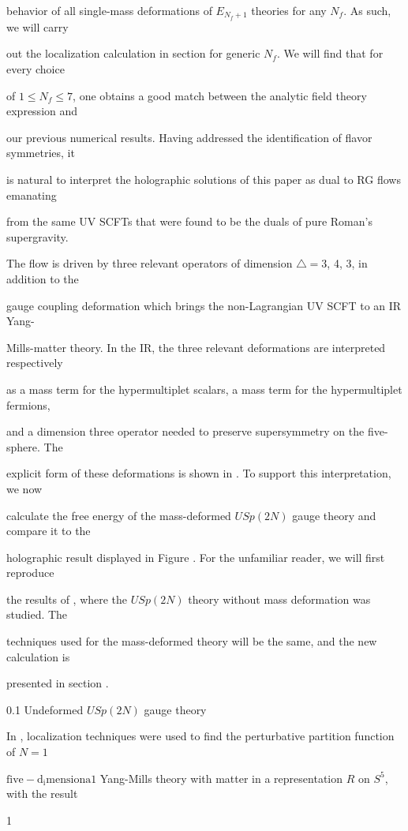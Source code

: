 \documentclass[a4paper,12pt]{article}
\begin{document}
behavior of all single-mass deformations of $E_{N_{f}+1}$ theories for any $N_{f}$. As such, we will carry

out the localization calculation in section for generic $N_{f}$. We will find that for every choice

of $1 \leq N_{f} \leq 7$, one obtains a good match between the analytic field theory expression and

our previous numerical results. Having addressed the identification of flavor symmetries, it

is natural to interpret the holographic solutions of this paper as dual to RG flows emanating

from the same UV SCFTs that were found to be the duals of pure Roman's supergravity.

The flow is driven by three relevant operators of dimension $\triangle = 3$, 4, 3, in addition to the

gauge coupling deformation which brings the non-Lagrangian UV SCFT to an IR Yang-

Mills-matter theory. In the IR, the three relevant deformations are interpreted respectively

as a mass term for the hypermultiplet scalars, a mass term for the hypermultiplet fermions,

and a dimension three operator needed to preserve supersymmetry on the five-sphere. The

explicit form of these deformations is shown in . To support this interpretation, we now

calculate the free energy of the mass-deformed $USp(2N)$ gauge theory and compare it to the

holographic result displayed in Figure . For the unfamiliar reader, we will first reproduce

the results of , where the $USp(2N)$ theory without mass deformation was studied. The

techniques used for the mass-deformed theory will be the same, and the new calculation is

presented in section .

0.1 Undeformed $USp(2N)$ gauge theory

In , localization techniques were used to find the perturbative partition function of $N= 1$

$\mathrm{f}\mathrm{i}\mathrm{v}\mathrm{e}-\mathrm{d}_{\mathrm{i}}\mathrm{m}\mathrm{e}\mathrm{n}\mathrm{s}\mathrm{i}\mathrm{o}\mathrm{n}\mathrm{a}1$ Yang-Mills theory with matter in a representation $R$ on $S^{5}$, with the result

1
\end{document}
